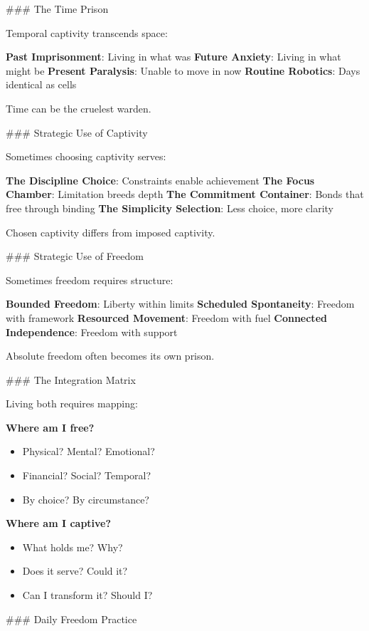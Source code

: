 \documentclass[12pt]{book}
\begin{document}
\#\#\# The Time Prison

Temporal captivity transcends space:

\textbf{Past Imprisonment}: Living in what was
\textbf{Future Anxiety}: Living in what might be
\textbf{Present Paralysis}: Unable to move in now
\textbf{Routine Robotics}: Days identical as cells

Time can be the cruelest warden.

\#\#\# Strategic Use of Captivity

Sometimes choosing captivity serves:

\textbf{The Discipline Choice}: Constraints enable achievement
\textbf{The Focus Chamber}: Limitation breeds depth
\textbf{The Commitment Container}: Bonds that free through binding
\textbf{The Simplicity Selection}: Less choice, more clarity

Chosen captivity differs from imposed captivity.

\#\#\# Strategic Use of Freedom

Sometimes freedom requires structure:

\textbf{Bounded Freedom}: Liberty within limits
\textbf{Scheduled Spontaneity}: Freedom with framework
\textbf{Resourced Movement}: Freedom with fuel
\textbf{Connected Independence}: Freedom with support

Absolute freedom often becomes its own prison.

\#\#\# The Integration Matrix

Living both requires mapping:

\textbf{Where am I free?}
\begin{itemize}
\item Physical? Mental? Emotional?
\item Financial? Social? Temporal?
\item By choice? By circumstance?

\end{itemize}
\textbf{Where am I captive?}
\begin{itemize}
\item What holds me? Why?
\item Does it serve? Could it?
\item Can I transform it? Should I?

\end{itemize}
\#\#\# Daily Freedom Practice
\end{document}
